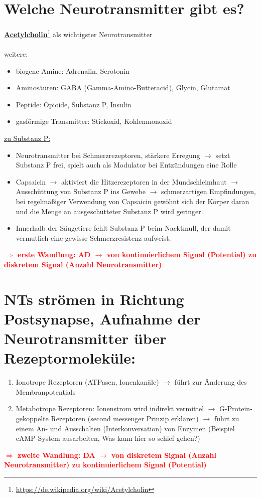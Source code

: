 \documentclass[12pt,a4paper]{article}
\begin{document}
\section{Welche Neurotransmitter gibt es?}
\textbf{\underline{Acetylcholin}}\footnote{\url{https://de.wikipedia.org/wiki/Acetylcholin}} als wichtigster Neurotransmitter\\\\
weitere:
\begin{itemize}
	\item biogene Amine: Adrenalin, Serotonin
	\item Aminosäuren: GABA (Gamma-Amino-Butteracid), Glycin, Glutamat
	\item Peptide: Opioide, Substanz P, Insulin
	\item gasförmige Transmitter: Stickoxid, Kohlenmonoxid
\end{itemize}

\underline{zu Substanz P:}
\begin{itemize}
	\item Neurotransmitter bei Schmerzrezeptoren, stärkere Erregung $\rightarrow$ setzt Substanz P frei, spielt auch als Modulator bei Entzündungen eine Rolle
	\item Capsaicin $\rightarrow$ aktiviert die Hitzerezeptoren in der Mundschleimhaut $\rightarrow$ Ausschüttung von Substanz P ins Gewebe $\rightarrow$ schmerzartigen Empfindungen, bei regelmäßiger Verwendung von Capsaicin gewöhnt sich der Körper daran und die Menge an ausgeschütteter Substanz P wird geringer.
	\item Innerhalb der Säugetiere fehlt Substanz P beim Nacktmull, der damit vermutlich eine gewisse Schmerzresistenz aufweist.
\end{itemize}

\textcolor{red}{\textbf{$\Rightarrow$ erste Wandlung: AD $\rightarrow$ von kontinuierlichem Signal (Potential) zu diskretem Signal (Anzahl Neurotransmitter)}}

\section{NTs strömen in Richtung Postsynapse, Aufnahme der Neurotransmitter über Rezeptormoleküle:}
	\begin{enumerate}
		\item Ionotrope Rezeptoren (ATPasen, Ionenkanäle) $\rightarrow$ führt zur Änderung des Membranpotentials
		\item Metabotrope Rezeptoren: Ionenstrom wird indirekt vermittel $\rightarrow$ G-Protein-gekoppelte Rezeptoren (second messenger Prinzip erklären) $\rightarrow$ führt zu einem An- und Ausschalten (Interkonversation) von Enzymen (Beispiel cAMP-System ausarbeiten, 	Was kann hier so schief gehen?)
	\end{enumerate}

\textcolor{red}{\textbf{$\Rightarrow$ zweite Wandlung: DA $\rightarrow$ von diskretem Signal (Anzahl Neurotransmitter) zu kontinuierlichem Signal (Potential)}}
\end{document}
